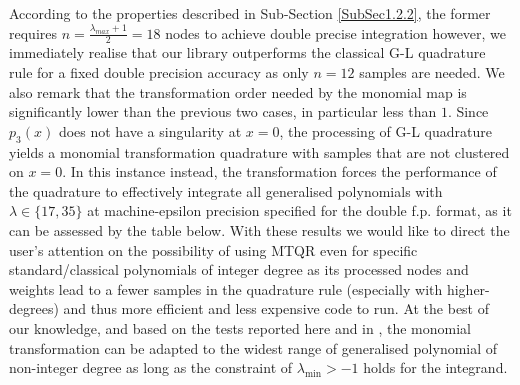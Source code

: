 \documentclass[a4paper, twosided]{book}
\begin{document}
\noindent
 According to the properties described in Sub-Section \ref{SubSec1.2.2}, the former requires $n=\frac{\lambda_{max}+1}{2}=18$ nodes to achieve double precise integration however, we immediately realise that our library outperforms the classical G-L quadrature rule for a fixed double precision accuracy as only $n=12$ samples are needed. We also remark  that the transformation order needed by the monomial map is significantly lower than the previous two cases, in particular less than $1$. Since $p_3(x)$ does not have a singularity at $x=0$, the processing of G-L quadrature yields a monomial transformation quadrature with samples that are not clustered on $x=0$. In this instance instead, the transformation forces the performance of the quadrature to effectively integrate all generalised polynomials with $\lambda\in\{17,35\}$ at machine-epsilon precision specified for the double f.p. format, as it can be assessed by the table below. With these results we would like to direct the user's attention on the possibility of using MTQR even for specific standard/classical polynomials of integer degree as its processed nodes and weights lead to a fewer samples in the quadrature rule (especially with higher-degrees) and thus more efficient and less expensive code to run. At the best of our knowledge, and based on the tests reported here and in \cite{Lombardi09, Lombardi21}, the monomial transformation can be adapted to the widest range of generalised polynomial of non-integer degree as long as the constraint of $\lambda_{\text{min}}>-1$ holds for the integrand.
\end{document}
